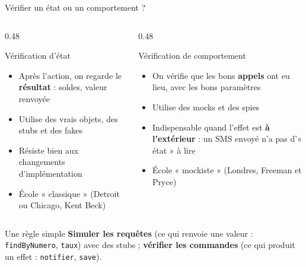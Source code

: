 \documentclass[aspectratio=169,10pt]{beamer}
\begin{document}
\begin{frame}{Vérifier un état ou un comportement ?}
  \small
  \begin{columns}[T]
    \begin{column}{0.48\textwidth}
      \begin{block}{Vérification d'état}
        \begin{itemize}
          \item Après l'action, on regarde le \textbf{résultat} : soldes, valeur renvoyée
          \item Utilise des vrais objets, des stubs et des fakes
          \item Résiste bien aux changements d'implémentation
          \item École « classique » (Detroit ou Chicago, Kent Beck)
        \end{itemize}
      \end{block}
    \end{column}
    \begin{column}{0.48\textwidth}
      \begin{block}{Vérification de comportement}
        \begin{itemize}
          \item On vérifie que les bons \textbf{appels} ont eu lieu, avec les bons paramètres
          \item Utilise des mocks et des spies
          \item Indispensable quand l'effet est \textbf{à l'extérieur} : un SMS envoyé n'a pas d'« état » à lire
          \item École « mockiste » (Londres, Freeman et Pryce)
        \end{itemize}
      \end{block}
    \end{column}
  \end{columns}
  \vspace{3mm}
  \begin{exampleblock}{Une règle simple}
    \textbf{Simuler les requêtes} (ce qui renvoie une valeur : \texttt{findByNumero}, \texttt{taux}) avec des stubs ; \textbf{vérifier les commandes} (ce qui produit un effet : \texttt{notifier}, \texttt{save}).
  \end{exampleblock}
\end{frame}
\end{document}
